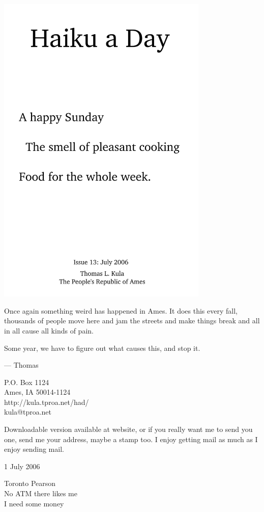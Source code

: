 \documentclass[12pt]{article}
\begin{document}
\includegraphics[width=101mm]{frontpage.png}

\newpage

Once again something weird has happened in Ames.
It does this every fall, thousands of people move
here and jam the streets and make things break
and all in all cause all kinds of pain.

Some year, we have to figure out what causes this,
and stop it.

--- Thomas

P.O. Box 1124 \\
Ames, IA 50014-1124 \\
http://kula.tproa.net/had/ \\
kula@tproa.net

Downloadable version available at website, or if you really
want me to send you one, send me your address, maybe a
stamp too. I enjoy getting mail as much as I enjoy sending
mail.\\

\setlength{\parskip}{1mm}

1 July 2006

Toronto Pearson \\
No ATM there likes me \\
I need some money
\end{document}
